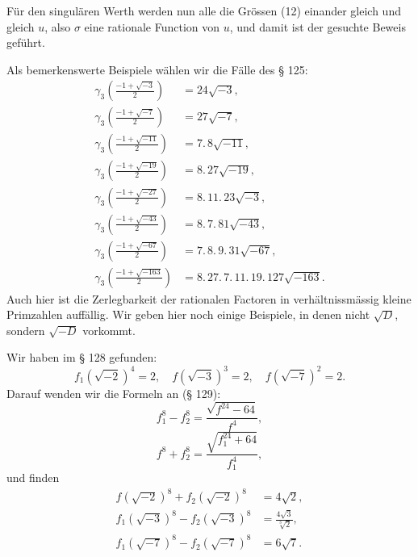 
Für den singulären Werth werden nun alle die Grössen (12)
einander gleich und gleich $u$, also $\sigma$ eine rationale Function von
$u$, und damit ist der gesuchte Beweis geführt.

Als bemerkenswerte Beispiele wählen wir die Fälle des § 125:
\[
\begin{aligned}
\gamma_3\left(\frac{-1+\sqrt{-3}}{2}\right) &= 24\sqrt{-3}, \\
\gamma_3\left(\frac{-1+\sqrt{-7}}{2}\right) &= 27\sqrt{-7}, \\
\gamma_3\left(\frac{-1+\sqrt{-11}}{2}\right) &= 7.\,8\sqrt{-11}, \\
\gamma_3\left(\frac{-1+\sqrt{-19}}{2}\right) &= 8.\,27\sqrt{-19}, \\
\gamma_3\left(\frac{-1+\sqrt{-27}}{2}\right) &= 8.\,11.\,23\sqrt{-3}, \\
\gamma_3\left(\frac{-1+\sqrt{-43}}{2}\right) &= 8.\,7.\,81\sqrt{-43}, \\
\gamma_3\left(\frac{-1+\sqrt{-67}}{2}\right) &= 7.\,8.\,9.\,31\sqrt{-67}, \\ %
\gamma_3\left(\frac{-1+\sqrt{-163}}{2}\right) &= 8.\,27.\,7.\,11.\,19.\,127\sqrt{-163}.
\end{aligned}
\]
Auch hier ist die Zerlegbarkeit der rationalen Factoren in verhältnissmässig kleine Primzahlen auffällig. Wir geben hier noch
einige Beispiele, in denen nicht $\sqrt{D}$, sondern $\sqrt{-D}$ vorkommt.

Wir haben im § 128 gefunden:
\[
f_1(\sqrt{-2})^4 = 2, \quad f(\sqrt{-3})^3 = 2, \quad f(\sqrt{-7})^2 = 2.
\]
Darauf wenden wir die Formeln an (§ 129):
\[
f_1^8 - f_2^8 = \frac{\sqrt{f^{24} - 64}}{f^4},
\]
\[
f^8 + f_2^8 = \frac{\sqrt{f_1^{24} + 64}}{f_1^4},
\]
und finden
\[
\begin{aligned}
f(\sqrt{-2})^8 + f_2(\sqrt{-2})^8 &= 4\sqrt{2}, \\
f_1(\sqrt{-3})^8 - f_2(\sqrt{-3})^8 &= \frac{4\sqrt{3}}{\sqrt[3]{2}}, \\
f_1(\sqrt{-7})^8 - f_2(\sqrt{-7})^8 &= 6\sqrt{7}.
\end{aligned}
\]
